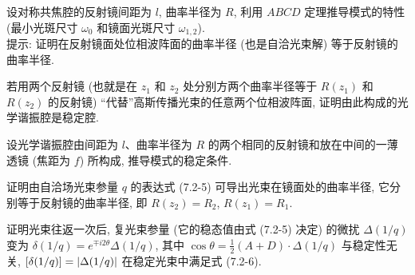 \documentclass{note}
\begin{document}
\begin{exe}
    设对称共焦腔的反射镜间距为 $l$, 曲率半径为 $R$, 利用 $ABCD$ 定理推导模式的特性 (最小光斑尺寸 $\omega_0$ 和镜面光斑尺寸 $\omega_{1,2}$).\\
    提示: 证明在反射镜面处位相波阵面的曲率半径 (也是自洽光束解) 等于反射镜的曲率半径.
\end{exe}
\begin{sol}
    
\end{sol}

\begin{exe}
    若用两个反射镜 (也就是在 $z_1$ 和 $z_2$ 处分别方两个曲率半径等于 $R(z_1)$ 和 $R(z_2)$ 的反射镜) ``代替''高斯传播光束的任意两个位相波阵面, 证明由此构成的光学谐振腔是稳定腔.
\end{exe}
\begin{pf}
    
\end{pf}

\begin{exe}
    设光学谐振腔由间距为 $l$、曲率半径为 $R$ 的两个相同的反射镜和放在中间的一薄透镜 (焦距为 $f$) 所构成, 推导模式的稳定条件.
\end{exe}
\begin{sol}
    
\end{sol}

\begin{exe}
    证明由自洽场光束参量 $q$ 的表达式 (7.2-5) 可导出光束在镜面处的曲率半径, 它分别等于反射镜的曲率半径, 即 $R(z_2)=R_2$, $R(z_1)=R_1$.
\end{exe}
\begin{pf}
    
\end{pf}

\begin{exe}
    证明光束往返一次后, 复光束参量 (它的稳态值由式 (7.2-5) 决定) 的微扰 $\Delta(1/q)$ 变为 $\delta(1/q)=e^{\mp i2\theta}\Delta(1/q)$, 其中 $\cos\theta=\frac{1}{2}(A+D)\cdot\Delta(1/q)$ 与稳定性无关, $[\delta(1/q)]=\left\lvert\Delta(1/q)\right\rvert$ 在稳定光束中满足式 (7.2-6).
\end{exe}
\begin{pf}
    
\end{pf}
\ifx\allfiles\undefined
\end{document}
